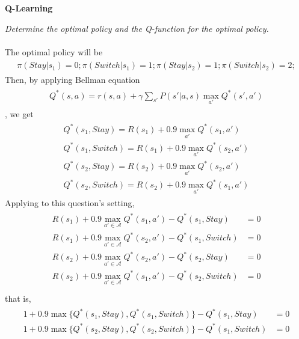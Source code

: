 \documentclass{myhw}
\begin{document}
\begin{homeworkProblem}
\textbf{Q-Learning}
\begin{homeworkSection}	
\emph{Determine the optimal policy and the Q-function for the optimal policy.} \\
\\
The optimal policy will be 
\begin{gather*}
\begin{aligned}
\pi(Stay|s_1) = 0; 
\pi(Switch|s_1) = 1; 
\pi(Stay|s_2) = 1; 
\pi(Switch|s_2) = 2; 
\end{aligned}
\end{gather*}
Then, by applying Bellman equation
\begin{gather*}
\begin{aligned}
Q^*(s,a) = r(s,a) + \gamma \sum_{s'} P(s'|a,s) \max_{a'} Q^*(s',a')
\end{aligned}
\end{gather*}
, we get
\begin{gather*}
\begin{aligned}
Q^*(s_1,Stay) = R(s_1) + 0.9 \max_{a'} Q^*(s_1,a') \\
Q^*(s_1,Switch) = R(s_1) + 0.9 \max_{a'} Q^*(s_2,a') \\
Q^*(s_2,Stay) = R(s_2) + 0.9 \max_{a'} Q^*(s_2,a') \\
Q^*(s_2,Switch) = R(s_2) + 0.9 \max_{a'} Q^*(s_1,a') 
\end{aligned}
\end{gather*}
Applying to this question's setting, 
\begin{gather*}
\begin{aligned}
R(s_1) + 0.9 \max_{a'\in\mathcal{A}} Q^*(s_1,a') - Q^*(s_1, Stay) &= 0 \\
R(s_1) + 0.9 \max_{a'\in\mathcal{A}} Q^*(s_2,a') - Q^*(s_1, Switch) &= 0 \\
R(s_2) + 0.9 \max_{a'\in\mathcal{A}} Q^*(s_2,a') - Q^*(s_2, Stay) &= 0 \\
R(s_2) + 0.9 \max_{a'\in\mathcal{A}} Q^*(s_1,a') - Q^*(s_2, Switch) &= 0 \\
\end{aligned}
\end{gather*}
that is,
\begin{gather*}
\begin{aligned}
1 + 0.9 \max \{Q^*(s_1,Stay),Q^*(s_1,Switch)\} - Q^*(s_1, Stay) &= 0 \\
1 + 0.9 \max \{Q^*(s_2,Stay),Q^*(s_2,Switch)\} - Q^*(s_1, Switch) &= 0 \\

\end{aligned}
\end{gather*}
\end{homeworkSection}
\end{homeworkProblem}
\end{document}
